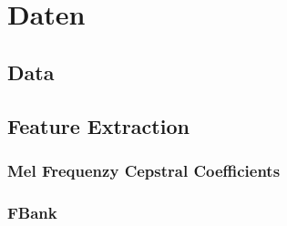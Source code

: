 %
% 
%

\chapter{Daten}

\section{Data}



\section{Feature Extraction}

\subsection{Mel Frequenzy Cepstral Coefficients}

\subsection{FBank}



%
%